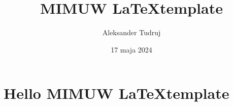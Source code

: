 \documentclass[a4paper,12pt]{article}
\title{ MIMUW \LaTeX template }
\author{ Aleksander Tudruj }
\date{ 17 maja 2024 }
\begin{document}
\maketitle

\section{Hello MIMUW \LaTeX template}
\end{document}
